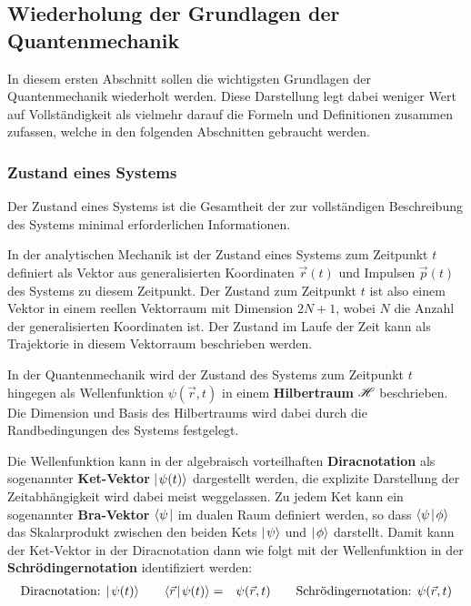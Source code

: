 %
%
%

\setcounter{subsection}{-1}
\subsection{Wiederholung der Grundlagen der Quantenmechanik}
In diesem ersten Abschnitt sollen die wichtigsten Grundlagen der Quantenmechanik wiederholt werden. Diese Darstellung legt dabei weniger Wert auf Vollständigkeit als vielmehr darauf die Formeln und Definitionen zusammen zufassen, welche in den folgenden Abschnitten gebraucht werden. 

\subsubsection{Zustand eines Systems}

Der Zustand eines Systems ist die Gesamtheit der zur vollständigen Beschreibung des Systems minimal erforderlichen Informationen. 

In der analytischen Mechanik ist der Zustand eines Systems zum Zeitpunkt $t$ definiert als Vektor aus generalisierten Koordinaten $\vec{r}(t)$ und Impulsen $\vec{p}(t)$ des Systems zu diesem Zeitpunkt. Der Zustand zum Zeitpunkt $t$ ist also einem Vektor in einem reellen Vektorraum mit Dimension $2N+1$, wobei $N$ die Anzahl der generalisierten Koordinaten ist. Der Zustand im Laufe der Zeit kann als Trajektorie in diesem Vektorraum beschrieben werden. 

In der Quantenmechanik wird der Zustand des Systems zum Zeitpunkt $t$ hingegen als Wellenfunktion $\psi(\vec{r},t)$ in einem {\bf Hilbertraum} $\mathscr H$ beschrieben. Die Dimension und Basis des Hilbertraums wird dabei durch die Randbedingungen des Systems festgelegt. 

Die Wellenfunktion kann in der algebraisch vorteilhaften {\bf Diracnotation} als sogenannter {\bf Ket-Vektor} $\mid\!\!\!\,\,{\psi(t)}\rangle$ dargestellt werden, die explizite Darstellung der Zeitabhängigkeit wird dabei meist weggelassen. Zu jedem Ket kann ein sogenannter {\bf Bra-Vektor} $\langle{\psi}\!\!\!\,\,\mid$ im dualen Raum definiert werden, so dass $\langle{\psi}\!\!\!\,\,\mid\!\!\!\,\,{\phi}\rangle$ das Skalarprodukt zwischen den beiden Kets $\mid\!\!\!\,\,{\psi}\rangle$ und $\mid\!\!\!\,\,{\phi}\rangle$ darstellt. Damit kann der Ket-Vektor in der Diracnotation dann wie folgt mit der Wellenfunktion in der {\bf Schrödingernotation} identifiziert werden: 
\begin{eqnarray*}
	\text{Diracnotation: $\ket{\psi(t)}$}\qquad \braket{\vec{r}}{\psi(t)} &=& \psi(\vec{r},t) \qquad\text{Schrödingernotation: $\psi(\vec{r},t)$} 
\end{eqnarray*}

